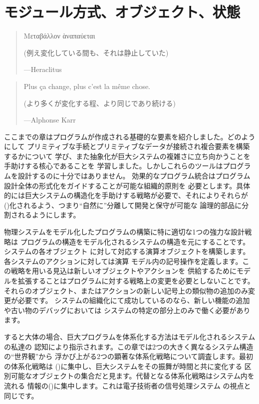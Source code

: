 \chapter{モジュール方式、オブジェクト、状態}
\label{Chapter 3}

\begin{quote}
\begin{greek}
Mεταβάλλον ὰναπαύεται
\end{greek}

(例え変化している間も、それは静止していた)

---Heraclitus
\end{quote}

\begin{quote}
Plus \c{c}a change, plus c'est la m\^{e}me chose.

(より多くが変化する程、より同じであり続ける)

---Alphonse Karr
\end{quote}

\vspace{1.0em}

\noindent
ここまでの章はプログラムが作成される基礎的な要素を紹介しました。どのようにして
プリミティブな手続とプリミティブなデータが接続され複合要素を構築するかについて
学び、また抽象化が巨大システムの複雑さに立ち向かうことを手助けする核心であることを
学習しました。しかしこれらのツールはプログラムを設計するのに十分ではありません。
効果的なプログラム統合はプログラム設計全体の形式化をガイドすることが可能な組織的原則を
必要とします。具体的には巨大システムの構造化を手助けする戦略が必要で、それによりそれらが
()化されるよう、つまり``自然に''分離して開発と保守が可能な
論理的部品に分割されるようにします。



物理システムをモデル化したプログラムの構築に特に適切な1つの強力な設計戦略は
プログラムの構造をモデル化されるシステムの構造を元にすることです。システムの各オブジェクト
に対して対応する演算オブジェクトを構築します。各システムのアクションに対しては演算
モデル内の記号操作を定義します。この戦略を用いる見込は新しいオブジェクトやアクションを
供給するためにモデルを拡張することはプログラムに対する戦略上の変更を必要としないことです。
それらのオブジェクト、またはアクションの新しい記号上の類似物の追加のみ変更が必要です。
システムの組織化にて成功しているのなら、新しい機能の追加や古い物のデバッグにおいては
システムの特定の部分上のみで働く必要があります。



すると大体の場合、巨大プログラムを体系化する方法はモデル化されるシステムの私達の
認知により指示されます。この章では2つの大きく異なるシステム構造の``世界観''から
浮かび上がる2つの顕著な体系化戦略について調査します。最初の体系化戦略は
()に集中し、巨大システムをその振舞が時間と共に変化する
区別可能なオブジェクトの集合だと見ます。代替となる体系化戦略はシステム内を流れる
情報の()に集中します。これは電子技術者の信号処理システム
の視点と同じです。


